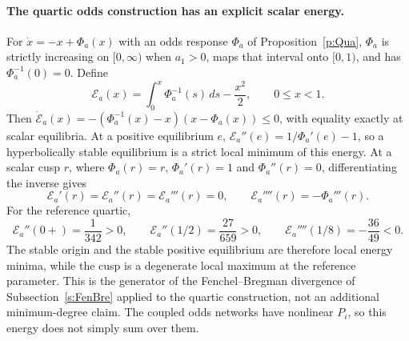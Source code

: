 \paragraph{The quartic odds construction has an explicit scalar energy.}
For $\dot x=-x+\Phi_a(x)$ with an odds response $\Phi_a$ of Proposition~\ref{p:Qua}, $\Phi_a$ is strictly
increasing on $[0,\infty)$ when $a_1>0$, maps that interval onto $[0,1)$, and has $\Phi_a^{-1}(0)=0$. Define
\[
 \mathcal E_a(x)=\int_0^x\Phi_a^{-1}(s)\,ds-\frac{x^2}{2},\qquad 0\le x<1.
\]
Then $\dot{\mathcal E}_a(x)=-(\Phi_a^{-1}(x)-x)(x-\Phi_a(x))\le0$, with equality exactly at scalar equilibria.
At a positive equilibrium $e$, $\mathcal E_a''(e)=1/\Phi_a'(e)-1$, so a hyperbolically stable equilibrium
is a strict local minimum of this energy. At a scalar cusp $r$, where $\Phi_a(r)=r$, $\Phi_a'(r)=1$ and
$\Phi_a''(r)=0$, differentiating the inverse gives
\[
 \mathcal E_a'(r)=\mathcal E_a''(r)=\mathcal E_a'''(r)=0,\qquad \mathcal E_a''''(r)=-\Phi_a'''(r).
\]
For the reference quartic,
\[
 \mathcal E_a''(0+)=\frac1{342}>0,\qquad
 \mathcal E_a''(1/2)=\frac{27}{659}>0,\qquad
 \mathcal E_a''''(1/8)=-\frac{36}{49}<0.
\]
The stable origin and the stable positive equilibrium are therefore local energy minima, while the
cusp is a degenerate local maximum at the reference parameter. This is the generator of the Fenchel--Bregman divergence
of Subsection~\ref{s:FenBre} applied to the quartic construction, not an additional minimum-degree
claim. The coupled odds networks have nonlinear $P_i$, so this energy does not simply sum over them.


